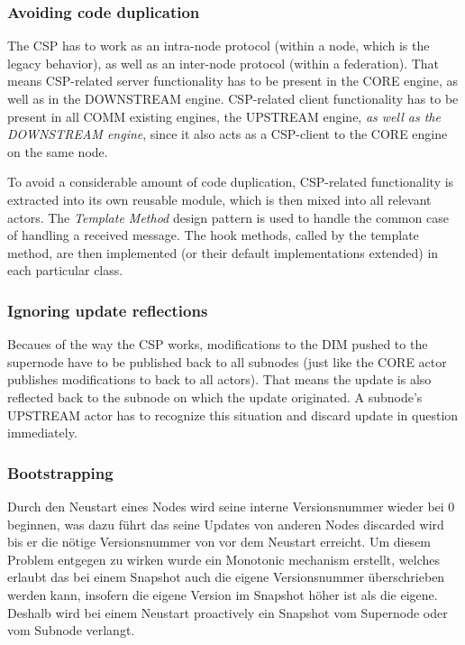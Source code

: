 \subsubsection{Avoiding code duplication}
The \gls{CSP} has to work as an intra-node protocol (within a node, which is
the legacy behavior), as well as an inter-node protocol (within a federation).
That means \gls{CSP}-related server functionality has to be present in the CORE
engine, as well as in the DOWNSTREAM engine. CSP-related client functionality has
to be present in all COMM existing engines, the UPSTREAM engine, \emph{as well
as the DOWNSTREAM engine}, since it also acts as a CSP-client to the CORE engine on
the same node.

To avoid a considerable amount of code duplication, CSP-related functionality
is extracted into its own reusable module, which is then mixed into all
relevant actors. The \emph{Template Method} design pattern is used to handle
the common case of handling a received
 message. The hook methods,
called by the template method, are then implemented (or their default
implementations extended) in each particular class.

\subsubsection{Ignoring update reflections}
Becaues of the way the \gls{CSP} works, modifications to the \gls{DIM} pushed
to the supernode have to be published back to all subnodes (just like the CORE
actor publishes modifications to back to all actors). That means the update is
also reflected back to the subnode on which the update originated. A subnode's
UPSTREAM actor has to recognize this situation and discard update in question
immediately.

\subsubsection{Bootstrapping}
Durch den Neustart eines Nodes wird seine interne Versionsnummer wieder bei 0 beginnen,
was dazu führt das seine Updates von anderen Nodes discarded wird bis er die nötige
Versionsnummer von vor dem Neustart erreicht. Um diesem Problem entgegen zu wirken
wurde ein Monotonic mechanism erstellt, welches erlaubt das bei einem Snapshot auch die
eigene Versionsnummer überschrieben werden kann, insofern die eigene Version im Snapshot höher
ist als die eigene. Deshalb wird bei einem Neustart proactively ein Snapshot vom Supernode oder
vom Subnode verlangt.

